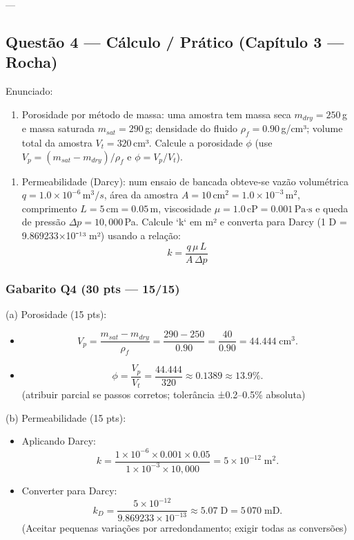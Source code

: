 \documentclass[11pt,a4paper]{article}
\begin{document}
---

\subsection{Questão 4 — Cálculo / Prático (Capítulo 3 — Rocha)}

Enunciado:
\begin{enumerate}[label=\Alph*)]
\item Porosidade por método de massa: uma amostra tem massa seca $m_{dry}=250\,$g e massa saturada $m_{sat}=290\,$g; densidade do fluido $\rho_f=0.90\,$g/cm³; volume total da amostra $V_t=320\,$cm³. Calcule a porosidade $\phi$ (use $V_p=(m_{sat}-m_{dry})/\rho_f$ e $\phi=V_p/V_t$).\n\end{enumerate}

\begin{enumerate}[label=\Alph*)]
\item Permeabilidade (Darcy): num ensaio de bancada obteve‑se vazão volumétrica $q=1.0\times10^{-6}\,\text{m}^3/s$, área da amostra $A=10\,\text{cm}^2=1.0\times10^{-3}\,\text{m}^2$, comprimento $L=5\,\text{cm}=0.05\,\text{m}$, viscosidade $\mu=1.0\,\text{cP}=0.001\,\text{Pa·s}$ e queda de pressão $\Delta p=10{,}000\,$Pa. Calcule `k` em m² e converta para Darcy (1 D = 9.869233×10⁻¹³ m²) usando a relação:\n$$k=\dfrac{q\,\mu\,L}{A\,\Delta p}$$
\end{enumerate}

\subsubsection{Gabarito Q4 (30 pts — 15/15)}
(a) Porosidade (15 pts):
\begin{itemize}
\item $$V_p=\dfrac{m_{sat}-m_{dry}}{\rho_f}=\dfrac{290-250}{0.90}=\dfrac{40}{0.90}=44.444\;\text{cm}^3.$$ 
\item $$\phi=\dfrac{V_p}{V_t}=\dfrac{44.444}{320}\approx0.1389\approx13.9\%. $$
(atribuir parcial se passos corretos; tolerância ±0.2–0.5\% absoluta)
\end{itemize}

(b) Permeabilidade (15 pts):
\begin{itemize}
\item Aplicando Darcy:
  $$k=\dfrac{1\times10^{-6}\times0.001\times0.05}{1\times10^{-3}\times10{,}000}=5\times10^{-12}\;\text{m}^2.$$ 
\item Converter para Darcy:
  $$k_{D}=\dfrac{5\times10^{-12}}{9.869233\times10^{-13}}\approx5.07\;\text{D}=5\,070\;\text{mD}.$$ 
(Aceitar pequenas variações por arredondamento; exigir todas as conversões)
\end{itemize}
\end{document}
